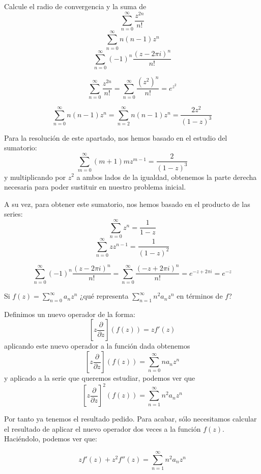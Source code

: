 \begin{problem}[16]
Calcule el radio de convergencia y la suma de
\ppart
\[\sum_{n=0}^{\infty}\frac{z^{2n}}{n!}\]
\ppart
\[\sum_{n=0}^{\infty}n(n-1)z^n\]
\ppart
\[\sum_{n=0}^{\infty}(-1)^n \frac{(z-2πi)^n}{n!}\]
\solution

\spart
\[\sum_{n=0}^{\infty}\frac{z^{2n}}{n!} = \sum_{n=0}^{\infty}\frac{(z^2)^n}{n!} = e^{z^2}\]

\spart

\[\sum_{n=0}^{\infty}n(n-1)z^n = \sum_{n=2}^{\infty}n(n-1)z^n = \frac{2z^2}{(1-z)^3}\]

Para la resolución de este apartado, nos hemos basado en el estudio del sumatorio:
\[\sum_{m=0}^{\infty} (m+1)mz^{m-1} = \frac{2}{(1-z)^3}\]
y multiplicando por $z^2$ a ambos lados de la igualdad, obtenemos la parte derecha necesaria para poder sustituir en nuestro problema inicial.

A su vez, para obtener este sumatorio, nos hemos basado en el producto de las series:
\[\sum_{n=0}^{\infty}z^n = \frac{1}{1-z}\]
\[\sum_{n=0}^{\infty}zz^{n-1} = \frac{1}{(1-z)^2}\]

\spart

\[\sum_{n=0}^{\infty}(-1)^n \frac{(z-2πi)^n}{n!} = \sum_{n=0}^{\infty} \frac{(-z+2πi)^n}{n!} = e^{-z+2πi} = e^{-z}\]
\end{problem}

\begin{problem}[17]
Si $f(z)=\sum_{n=0}^{\infty}a_nz^n$ ¿qué representa $\sum_{n=1}^{\infty}n^2a_nz^n$ en términos de $f$?
\solution

Definimos un nuevo operador de la forma:
\[\left[ z\frac{\partial}{\partial z}\right]\left( f(z) \right) = z f'(z)\]
aplicando este nuevo operador a la función dada obtenemos
\[\left[ z\frac{\partial}{\partial z}\right]\left( f(z) \right) = \sum_{n=0}^{\infty}na_nz^n  \]
y aplicado a la serie que queremos estudiar, podemos ver que
\[\left[ z\frac{\partial}{\partial z}\right]^2\left( f(z) \right)=  \sum_{n=1}^{\infty}n^2a_nz^n\]

Por tanto ya tenemos el resultado pedido. Para acabar, sólo necesitamos calcular el resultado de aplicar el nuevo operador dos veces a la función $f(z)$. Haciéndolo, podemos ver que:

\[zf'(z)+z^2f''(z)= \sum_{n=1}^{\infty}n^2a_nz^n\]
\end{problem}

